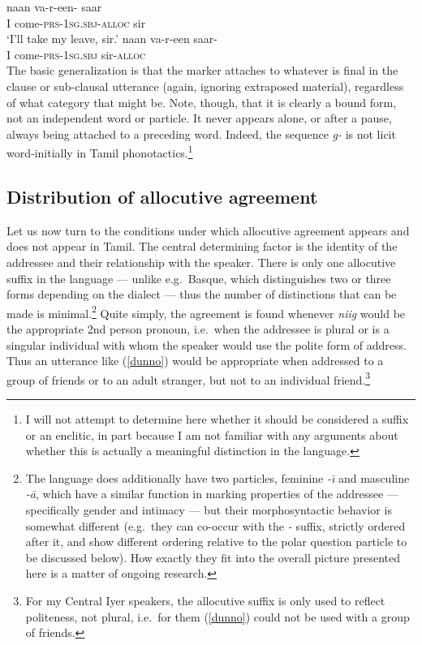 \documentclass[output=paper, modfonts, nonflat]{langsci/langscibook}
\begin{document}
\ea\label{vocative}
 \ea
   \gll naan va-r-een-\nga{} saar\\
   I come-\textsc{prs}-\textsc{1sg}.\textsc{sbj}-\textsc{alloc}{} sir\\
   \glt `I'll take my leave, sir.'
 \ex
   \gll *naan va-r-een saar-\nga{}\\
   I come-\textsc{prs}-\textsc{1sg}.\textsc{sbj}{} sir-\textsc{alloc}\\
 \z
\z
%
The basic generalization is that the marker attaches to whatever is
final in the clause or sub-clausal utterance (again, ignoring
extraposed material), regardless of what category that might be. Note,
though, that it is clearly a bound form, not an independent word or
particle. It never appears alone, or after a pause, always being
attached to a preceding word. Indeed, the sequence \textit{\ng g-} is
not licit word-initially in Tamil phonotactics.\footnote{I will not
  attempt to determine here whether it should be considered a suffix
  or an enclitic, in part because I am not familiar with any arguments
  about whether this is actually a meaningful distinction in the
  language.}

\subsection{Distribution of allocutive agreement}

Let us now turn to the conditions under which allocutive agreement
appears and does not appear in Tamil.
The central determining factor is the identity of the addressee and
their relationship with the speaker. There is only one allocutive
suffix in the language --- unlike e.g.\ Basque, which distinguishes
two or three forms depending on the dialect --- thus the number of
distinctions that can be made is minimal.\footnote{The language does
  additionally have two particles, feminine \textit{-\D \=\i} and
  masculine \textit{-\D\=a}, which have a similar function in marking
  properties of the addressee --- specifically gender and intimacy ---
  but their morphosyntactic behavior is somewhat different (e.g.\ they
  can co-occur with the \textit{-\nga} suffix, strictly ordered after
  it, and show different ordering relative to the polar question
  particle to be discussed below). How exactly they fit into the
  overall picture presented here is a matter of ongoing research.}
Quite simply, the agreement is found whenever \textit{nii\ng g\A}
would be the appropriate 2nd person pronoun, i.e.\ when the addressee
is plural or is a singular individual with whom the speaker would use
the polite form of address. Thus an utterance like (\ref{dunno}) would
be appropriate when addressed to a group of friends or to an adult
stranger, but not to an individual friend.\footnote{For my Central
  Iyer speakers, the allocutive suffix is only used to reflect
  politeness, not plural, i.e.\ for them (\ref{dunno}) could not be
  used with a group of friends.} 
\end{document}
